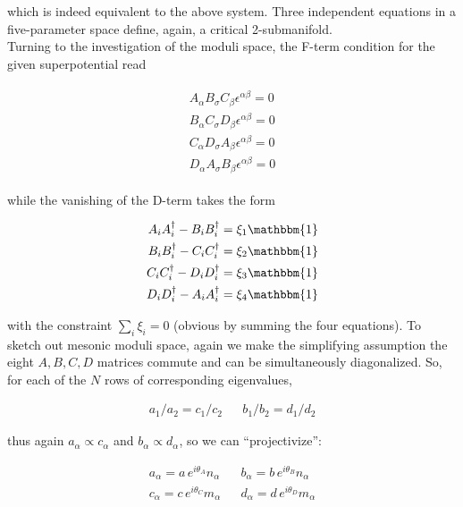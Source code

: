 which is indeed equivalent to the above system. Three independent equations in a five-parameter space define, again, a critical 2-submanifold.\\

Turning to the investigation of the moduli space, the F-term condition for the given superpotential read

\begin{align}
	\begin{split}
	A_\alpha B_\sigma C_\beta \epsilon^{\alpha\beta} = 0 \\
	B_\alpha C_\sigma D_\beta \epsilon^{\alpha\beta} = 0 \\
	C_\alpha D_\sigma A_\beta \epsilon^{\alpha\beta} = 0 \\
	D_\alpha A_\sigma B_\beta \epsilon^{\alpha\beta} = 0 
	\label{}
\end{split}
\end{align}

while the vanishing of the D-term takes the form

\begin{align}
	\begin{split}
		A_i A^\dagger_i - B_i B^\dagger_i = \xi_1 \mathbbm{1} \\
		B_i B^\dagger_i - C_i C^\dagger_i = \xi_2 \mathbbm{1} \\
		C_i C^\dagger_i - D_i D^\dagger_i = \xi_3 \mathbbm{1} \\
		D_i D^\dagger_i - A_i A^\dagger_i = \xi_4 \mathbbm{1}
	\end{split}
	\label{}
\end{align}

with the constraint $\sum_i \xi_i = 0$ (obvious by summing the four equations). To sketch out mesonic moduli space, again we make the simplifying assumption the eight $A, B, C, D$ matrices commute and can be simultaneously diagonalized. So, for each of the $N$ rows of corresponding eigenvalues,

\begin{align}
	a_1/a_2 = c_1/c_2 && b_1/b_2 = d_1 / d_2
	\label{}
\end{align}

thus again $a_\alpha \propto c_\alpha$ and $b_\alpha \propto d_\alpha$, so we can ``projectivize'':

\begin{align}
		a_\alpha = a \, e^{i\theta_A} n_\alpha && b_\alpha = b \, e^{i\theta_B} n_\alpha \\
		c_\alpha = c \, e^{i\theta_C} m_\alpha && d_\alpha = d \, e^{i\theta_D} m_\alpha 
\end{align}

